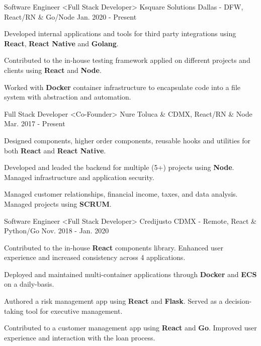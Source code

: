 \begin{cventries}
  \cventry
    {Software Engineer <Full Stack Developer>}
    {Ksquare Solutions}
    {Dallas - DFW, React/RN \& Go/Node}
    {Jan. 2020 - Present}
    {
      \begin{cvitems}
        \item {Developed internal applications and tools for third party integrations using \textbf{React}, \textbf{React Native} and \textbf{Golang}.}
        \item {Contributed to the in-house testing framework applied on different projects and clients using \textbf{React} and \textbf{Node}.}
        \item {Worked with \textbf{Docker} container infrastructure to encapsulate code into a file system with abstraction and automation.}
      \end{cvitems}
    }
  \cventry
    {Full Stack Developer <Co-Founder>}
    {Nure}
    {Toluca \& CDMX, React/RN \& Node}
    {Mar. 2017 - Present}
    {
      \begin{cvitems}
        \item {Designed components, higher order components, reusable hooks and utilities for both \textbf{React} and \textbf{React Native}.}
        \item {Developed and leaded the backend for multiple (5+) projects using \textbf{Node}. Managed infrastructure and application security.}
         \item {Managed customer relationships, financial income, taxes, and data analysis. Managed projects using \textbf{SCRUM}.}
      \end{cvitems}
    }
  \cventry
    {Software Engineer <Full Stack Developer>}
    {Credijusto}
    {CDMX - Remote, React \& Python/Go}
    {Nov. 2018 - Jan. 2020}
    {
      \begin{cvitems}
        \item {Contributed to the in-house \textbf{React} components library. Enhanced user experience and increased consistency across 4 applications.}
        \item {Deployed and maintained multi-container applications through \textbf{Docker} and \textbf{ECS} on a daily-basis.}
        \item {Authored a risk management app using \textbf{React} and \textbf{Flask}. Served as a decision-taking tool for executive management.}
        \item {Contributed to a customer management app using \textbf{React} and \textbf{Go}. Improved user experience and interaction with the loan process.}

\end{cvitems}}
\end{cventries}
